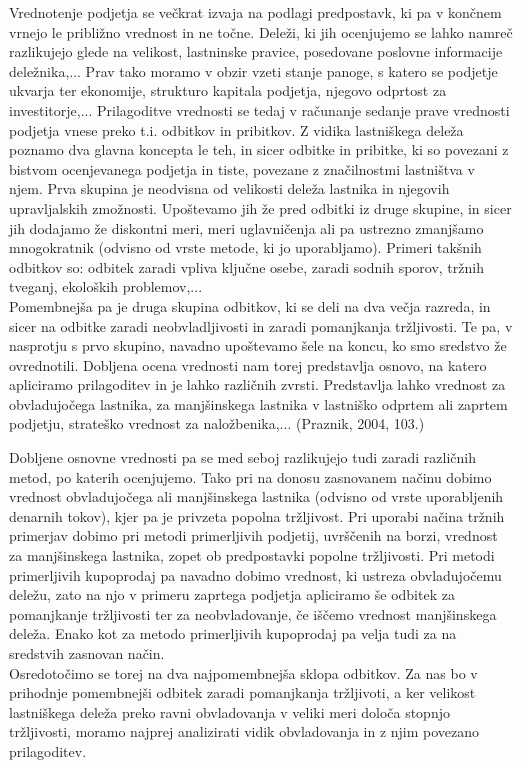 \documentclass[12pt,a4paper]{amsart}
\theoremstyle{definition} %
\theoremstyle{plain} %
\begin{document}
Vrednotenje podjetja se večkrat izvaja na podlagi predpostavk, ki pa v končnem vrnejo le približno vrednost in ne točne. Deleži, ki jih ocenjujemo se lahko namreč razlikujejo glede na velikost, lastninske pravice, posedovane poslovne informacije deležnika,... Prav tako moramo v obzir vzeti stanje panoge, s katero se podjetje ukvarja ter ekonomije, strukturo kapitala podjetja, njegovo odprtost za investitorje,... Prilagoditve vrednosti se tedaj v računanje sedanje prave vrednosti podjetja vnese preko t.i. odbitkov in pribitkov. Z vidika lastniškega deleža poznamo dva glavna koncepta le teh, in sicer odbitke in pribitke, ki so povezani z bistvom ocenjevanega podjetja in tiste, povezane z značilnostmi lastništva v njem. Prva skupina je neodvisna od velikosti deleža lastnika in njegovih upravljalskih zmožnosti. Upoštevamo jih že pred odbitki iz druge skupine, in sicer jih dodajamo že diskontni meri, meri uglavničenja ali pa ustrezno zmanjšamo mnogokratnik (odvisno od vrste metode, ki jo uporabljamo). Primeri takšnih odbitkov so: odbitek zaradi vpliva ključne osebe, zaradi sodnih sporov, tržnih tveganj, ekoloških problemov,... \\
Pomembnejša pa je druga skupina odbitkov, ki se deli na dva večja razreda, in sicer na odbitke zaradi neobvladljivosti in zaradi pomanjkanja tržljivosti. Te pa, v nasprotju s prvo skupino, navadno upoštevamo šele na koncu, ko smo sredstvo že ovrednotili. Dobljena ocena vrednosti nam torej predstavlja osnovo, na katero apliciramo prilagoditev in je lahko različnih zvrsti. Predstavlja lahko vrednost za obvladujočega lastnika, za manjšinskega lastnika v lastniško odprtem ali zaprtem podjetju, strateško vrednost za naložbenika,... (Praznik, 2004, 103.)\par
Dobljene osnovne vrednosti pa se med seboj razlikujejo tudi zaradi različnih metod, po katerih ocenjujemo. Tako pri na donosu zasnovanem načinu dobimo vrednost obvladujočega ali manjšinskega lastnika (odvisno od vrste uporabljenih denarnih tokov), kjer pa je privzeta popolna tržljivost. Pri uporabi načina tržnih primerjav dobimo pri metodi primerljivih podjetij, uvrščenih na borzi, vrednost za manjšinskega lastnika, zopet ob predpostavki popolne tržljivosti. Pri metodi primerljivih kupoprodaj pa navadno dobimo vrednost, ki ustreza obvladujočemu deležu, zato na njo v primeru zaprtega podjetja apliciramo še odbitek za pomanjkanje tržljivosti ter za neobvladovanje, če iščemo vrednost manjšinskega deleža. Enako kot za metodo primerljivih kupoprodaj pa velja tudi za na sredstvih zasnovan način.\\
Osredotočimo se torej na dva najpomembnejša sklopa odbitkov. Za nas bo v prihodnje pomembnejši odbitek zaradi pomanjkanja tržljivoti, a ker velikost lastniškega deleža preko ravni obvladovanja v veliki meri določa stopnjo tržljivosti, moramo najprej analizirati vidik obvladovanja in z njim povezano prilagoditev. 
\end{document}
